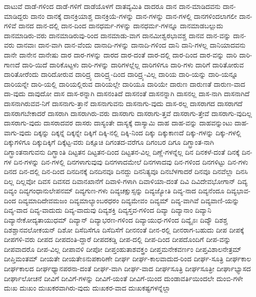 {ದಾಟುವೆ
ದಾಡೆ-ಗಳಿಂದ
ದಾಡೆ-ಗಳಿಗೆ
ದಾಡೆಯೊಳಗೆ
ದಾತವ್ಯಮಿತಿ
ದಾದರೂ
ದಾನ
ದಾನ-ಮಾಡಿದವನು
ದಾನ-ಮಾಡಿದ್ದರು
ದಾನಂ
ದಾನಕ್ಕೆ
ದಾನಕ್ರಿಯಾಶ್ಚ
ದಾನಕ್ರಿಯೆ-ಗಳನ್ನು
ದಾನ-ಗಳನ್ನು
ದಾನ-ಗಳಲ್ಲಿ
ದಾನಗಳಿಂದಲಾಗಲೀ
ದಾನ-ಗಳಿವೆ
ದಾನದ
ದಾನ-ದಲ್ಲಿ
ದಾನ-ದಿಂದ
ದಾನಧರ್ಮ-ಗಳನ್ನು
ದಾನಧರ್ಮ-ಗಳನ್ನೂ
ದಾನಮಾಡಬಲ್ಲುದು
ದಾನಮಾಡಿರು-ವರು
ದಾನಮಾಡಿರುವು-ರಿಂದ
ದಾನಮಾಡು-ವಾಗ
ದಾನಮೀಶ್ವರಭಾವಶ್ಚ
ದಾನವ
ದಾನ-ವನ್ನು
ದಾನ-ವರು
ದಾನವಾಃ
ದಾನ-ವಾಗಿ
ದಾನ-ವೆಂದು
ದಾನಾದಿ-ಗಳನ್ನು
ದಾನಾದಿ-ಗಳಿಂದ
ದಾನಿ
ದಾನಿ-ಗಳಲ್ಲ
ದಾನಿಯಾದವನು
ದಾನೇ
ದಾನೇನ
ದಾನೇಷು
ದಾರ
ದಾರ-ಗಳನ್ನು
ದಾರದ
ದಾರ-ದಂತೆ
ದಾರ-ದಲ್ಲಿ
ದಾರ-ದಿಂದ
ದಾರ-ವನ್ನು
ದಾರಿ
ದಾರಿ-ಗಾಣದೆ
ದಾರಿ-ಯಿದೆ
ದಾರಿಕೊಟ್ಟಳು
ದಾರಿ-ಗಳನ್ನು
ದಾರಿಗಳಲ್ಲೆಲ್ಲ
ದಾರಿಗಳಿಗೂ
ದಾರಿ-ಗಳು
ದಾರಿಗೆ
ದಾರಿತೋರುವ
ದಾರಿತೋರೆಂದು
ದಾರಿದೋರುವ
ದಾರಿದ್ರ್ಯ
ದಾರಿದ್ರ್ಯ-ದಿಂದ
ದಾರಿದ್ರ್ಯ-ವಿಲ್ಲ
ದಾರಿಯ
ದಾರಿ-ಯನ್ನು
ದಾರಿ-ಯನ್ನೂ
ದಾರಿಯನ್ನೇ
ದಾರಿ-ಯಲ್ಲಿ
ದಾರಿಯಲ್ಲಿರುವ
ದಾರಿಯಲ್ಲೇ
ದಾರಿಯೂ
ದಾರಿಯೇ
ದಾರುಣ
ದಾರುಣತೆ
ದಾರುಣ-ವಾದ
ದಾ-ವುದು
ದಾವುದೋ
ದಾಸ
ದಾಸ-ರನ್ನಾಗಿ
ದಾಸನಂತಿದೆ
ದಾಸನಂತೆ
ದಾಸನನ್ನಾಗಿ
ದಾಸನಲ್ಲ
ದಾಸ-ನಾಗಿ
ದಾಸನಾಗಿದೆ
ದಾಸನಾಗಿರುವವ-ನಿಗೆ
ದಾಸನಾಗು-ತ್ತಾನೆ
ದಾಸನಾಗುವನು
ದಾಸನಾಗು-ವುದು
ದಾಸ-ರಲ್ಲ
ದಾಸರಾಗದ
ದಾಸರಾಗದೆ
ದಾಸರಾಗಬೇಕಾದರೆ
ದಾಸರಾಗಿ
ದಾಸರಾಗಿರು-ವರು
ದಾಸರಾಗು
ದಾಸರಾಗು-ತ್ತವೆ
ದಾಸರಾಗು-ತ್ತೇವೆ
ದಾಸರಾಗು-ವುದಿಲ್ಲ
ದಾಸರಾಗು-ವುದು
ದಾಸರಾದವರ
ದಾಸರು
ದಾಸ್ಯಂತೇ
ದಾಸ್ಯಕ್ಕೆ
ದಾಸ್ಯಾಮಿ
ದಾಹ
ದಾಹ-ವನ್ನು
ದಾಹವನ್ನುಂಟು
ದಾಹ-ವಾಗು-ವುದು
ದಿಕ್ಕನ್ನು
ದಿಕ್ಕನ್ನೆ
ದಿಕ್ಕನ್ನೇ
ದಿಕ್ಕಿಗೆ
ದಿಕ್ಕಿ-ನಲ್ಲಿ
ದಿಕ್ಕಿ-ನಿಂದ
ದಿಕ್ಕು
ದಿಕ್ಕುಕಾಣದೆ
ದಿಕ್ಕು-ಗಳನ್ನು
ದಿಕ್ಕು-ಗಳಲ್ಲಿ
ದಿಕ್ಕುಗಳಿಗೂ
ದಿಕ್ಕುದಿಕ್ಕಿಗೆ
ದಿಕ್ಕೆಟ್ಟ-ವರು
ದಿಕ್ಸೂಚಿ
ದಿಗಂತದ-ವರೆಗೂ
ದಿಗಂಬರ
ದಿಗೂ
ದಿಗ್ಭ್ರಾಂತ-ನಾಗಿ
ದಿಗ್ಭ್ರಾಂತನಾಗುವನು
ದಿಗ್ಭ್ರಾಂತಿ
ದಿಟ್ಟತನ
ದಿಟ್ಟತನ-ದಿಂದ
ದಿಟ್ಟತನ-ವಿಲ್ಲ
ದಿಣ್ಣೆ-ಗಳನ್ನೆಲ್ಲ
ದಿನ
ದಿನಕಳೆ-ದಂತೆ
ದಿನಕ್ಕೆ
ದಿನ-ಗಳ
ದಿನ-ಗಳನ್ನು
ದಿನ-ಗಳಲ್ಲಿ
ದಿನಗಳಾಗುವುವು
ದಿನಗಳಾದಮೇಲೆ
ದಿನಗಳಾದವು
ದಿನ-ಗಳಿಂದ
ದಿನಗಳಿಟ್ಟು
ದಿನ-ಗಳು
ದಿನದ
ದಿನ-ದಲ್ಲಿ
ದಿನ-ದಿಂದ
ದಿನದಿನಕ್ಕೆ
ದಿನದಿನವೂ
ದಿನದ್ದು
ದಿನನಿತ್ಯವೂ
ದಿನಬೆಳಗಾದರೆ
ದಿನವೂ
ದಿನವೆಲ್ಲಾ
ದಿನಸಿ
ದಿಲ್ಲ
ದಿಲ್ಲವೋ
ದಿವಸ
ದಿವಸದ
ದಿವಾನಖಾನೆಗೆ
ದಿವಾಳಿ-ಗಳಾಗಿ
ದಿವಾಳಿಯಾ-ದಂತೆ
ದಿವಿ
ದಿವಿದೇವಭೋಗಾನ್
ದಿವ್ಯ
ದಿವ್ಯಂ
ದಿವ್ಯಗಂಧಾನುಲೇಪನಮ್
ದಿವ್ಯಗುಣ-ಗಳು
ದಿವ್ಯಚಕ್ಷುಸ್ಸನ್ನು
ದಿವ್ಯಜ್ಯೋತಿ
ದಿವ್ಯ-ನಾದ
ದಿವ್ಯನೆಂದೂ
ದಿವ್ಯಭಾವ-ದಿಂದ
ದಿವ್ಯಮಾದಿದೇವಮಜಂ
ದಿವ್ಯಮಾಲ್ಯಾಂಬರಧರಂ
ದಿವ್ಯಮೇವಂ
ದಿವ್ಯಮ್
ದಿವ್ಯ-ವಾಗಿವೆ
ದಿವ್ಯವಾಣಿ-ಯನ್ನು
ದಿವ್ಯ-ವಾದ
ದಿವ್ಯ-ವಾದುದು
ದಿವ್ಯ-ವಾದುವು
ದಿವ್ಯಶಕ್ತಿ
ದಿವ್ಯಸ್ತವ-ಗಳಿಂದ
ದಿವ್ಯಾ
ದಿವ್ಯಾನಾಂ
ದಿವ್ಯಾನಿ
ದಿವ್ಯಾನೇಕೋದ್ಯತಾಯುಧಮ್
ದಿವ್ಯಾನ್
ದಿವ್ಯಾಭರಣ-ಗಳಿಂದ
ದಿವ್ಯಾಯುಧ-ಗಳಿಂದ
ದಿವ್ಯೈಽಃ
ದಿವ್ಯೌ
ದಿಶಶ್ಚ
ದಿಶಶ್ಚಾನವಲೋಕಯನ್
ದಿಶೋ
ದಿಸೆದಿಸೆಗೂ
ದಿಸೆದಿಸೆಗೆ
ದೀನನಂತೆ
ದೀನ-ರಲ್ಲಿ
ದೀನರಾಗ-ಬಹುದು
ದೀಪ
ದೀಪಕ್ಕೆ
ದೀಪಗಳಿ-ವರು
ದೀಪದ
ದೀಪದಂತಿ-ದ್ದಾರೆ
ದೀಪದಕಡ್ಡಿ
ದೀಪ-ದಲ್ಲಿ
ದೀಪ-ದಿಂದ
ದೀಪದೊಂದಿಗೆ
ದೀಪ-ವನ್ನು
ದೀಪವಾದರೊ
ದೀಪ-ವಿಲ್ಲ
ದೀಪಾವಳಿ
ದೀಪೋ
ದೀಪ್ತಂಹುತಾಶವಕ್ತ್ರಂ
ದೀಪ್ತಮನೇಕವರ್ಣಂ
ದೀಪ್ತವಿಶಾಲನೇತ್ರಮ್
ದೀಪ್ತಿಮಂತಮ್
ದೀಯತೇ
ದೀಯತೇಽನುಪಕಾರಿಣೇ
ದೀರ್ಘ
ದೀರ್ಘ-ಕಾಲವಾದುದ-ರಿಂದ
ದೀರ್ಘ-ಸೂತ್ರಿ
ದೀರ್ಘಕಾಲ
ದೀರ್ಘಕಾಲದ
ದೀರ್ಘಧ್ಯಾನಪರನಾ-ದಂತೆ
ದೀರ್ಘ-ವಾಗಿ
ದೀರ್ಘ-ವಾದ
ದೀರ್ಘಸೂತ್ರಿ
ದೀರ್ಘಸೂತ್ರೀ
ದೀರ್ಘಾಭ್ಯಾಸದ
ದೀರ್ಘಾಲೋಚನೆ
ದೀವಿಗೆ
ದೀವಿಗೆ-ಗಳನ್ನು
ದೀವಿಗೆ-ಯಂತೆ
ದೀವಿಗೆ-ಯಿಂದ
ದುಂಡಾವರ್ತಿಯಿಂದಲೇ
ದುಂಬಿ-ಗಳೇ
ದುಃಖ
ದುಃಖಂ
ದುಃಖಕರವಾಗಿರು-ವುದು
ದುಃಖಕರ-ವಾದ
ದುಃಖಕಷ್ಟಗಳನ್ನೆಲ್ಲಾ
}
